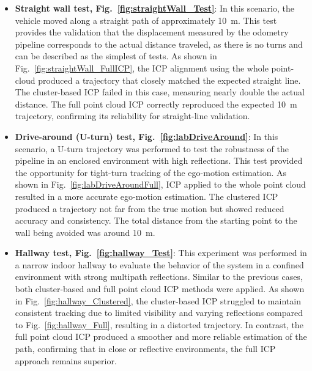 \begin{itemize}
    \item \textbf{Straight wall test, Fig.~\ref{fig:straightWall_Test}}:  
    In this scenario, the vehicle moved along a straight path of approximately 10~m.  
    This test provides the validation that the displacement measured by the odometry pipeline corresponds to the actual distance traveled, as there is no turns and can be described as the simplest of tests.  
    As shown in Fig.~\ref{fig:straightWall_FullICP}, the ICP alignment using the whole point-cloud produced a trajectory that closely matched the expected straight line.
    The cluster-based ICP failed in this case, measuring nearly double the actual distance.  
    The full point cloud ICP correctly reproduced the expected 10~m trajectory, confirming its reliability for straight-line validation. 
    
    \item \textbf{Drive-around (U-turn) test, Fig.~\ref{fig:labDriveAround}}:  
    In this scenario, a U-turn trajectory was performed to test the robustness of the pipeline in an enclosed environment with high reflections.  
    This test provided the opportunity for tight-turn tracking of the ego-motion estimation.  
    As shown in Fig.~\ref{fig:labDriveAroundFull}, ICP applied to the whole point cloud resulted in a more accurate ego-motion estimation.  
    The clustered ICP produced a trajectory not far from the true motion but showed reduced accuracy and consistency.  
    The total distance from the starting point to the wall being avoided was around 10~m.  

    \item \textbf{Hallway test, Fig.~\ref{fig:hallway_Test}}:  
    This experiment was performed in a narrow indoor hallway to evaluate the behavior of the system in a confined environment with strong multipath reflections.  
    Similar to the previous cases, both cluster-based and full point cloud ICP methods were applied.  
    As shown in Fig.~\ref{fig:hallway_Clustered}, the cluster-based ICP struggled to maintain consistent tracking due to limited visibility and varying reflections compared to Fig.~\ref{fig:hallway_Full}, resulting in a distorted trajectory.  
    In contrast, the full point cloud ICP produced a smoother and more reliable estimation of the path, confirming that in close or reflective environments, the full ICP approach remains superior.  

\end{itemize}

